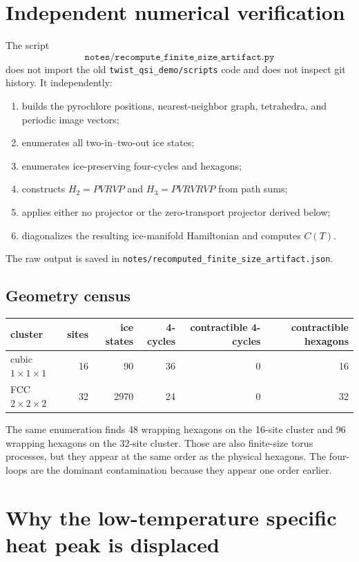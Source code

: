 \documentclass[11pt,letterpaper]{article}
\theoremstyle{plain}
\theoremstyle{definition}
\begin{document}
\section{Independent numerical verification}

The script
\[
\texttt{notes/recompute\_finite\_size\_artifact.py}
\]
does not import the old \texttt{twist\_qsi\_demo/scripts} code and does not
inspect git history.  It independently:
\begin{enumerate}[label=(\roman*)]
\item builds the pyrochlore positions, nearest-neighbor graph, tetrahedra,
and periodic image vectors;
\item enumerates all two-in--two-out ice states;
\item enumerates ice-preserving four-cycles and hexagons;
\item constructs $H_2=PVRVP$ and $H_3=PVRVRVP$ from path sums;
\item applies either no projector or the zero-transport projector derived
below;
\item diagonalizes the resulting ice-manifold Hamiltonian and computes
$C(T)$.
\end{enumerate}
The raw output is saved in
\texttt{notes/recomputed\_finite\_size\_artifact.json}.

\subsection{Geometry census}

\begin{center}
\begin{tabular}{lrrrrr}
\toprule
cluster & sites & ice states & 4-cycles & contractible 4-cycles
& contractible hexagons \\
\midrule
cubic $1\times1\times1$ & 16 & 90 & 36 & 0 & 16 \\
FCC $2\times2\times2$ & 32 & 2970 & 24 & 0 & 32 \\
\bottomrule
\end{tabular}
\end{center}

The same enumeration finds 48 wrapping hexagons on the 16-site cluster and
96 wrapping hexagons on the 32-site cluster.  Those are also finite-size
torus processes, but they appear at the same order as the physical
hexagons.  The four-loops are the dominant contamination because they
appear one order earlier.

\section{Why the low-temperature specific heat peak is displaced}
\end{document}
